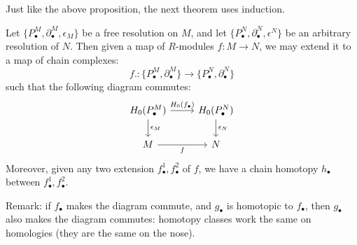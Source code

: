 Just like the above proposition, the next theorem uses induction. 
\begin{thm}
    Let $\{P_\bullet^M, \partial_\bullet^M, \epsilon_M\}$ be a free resolution on $M$, and let $\{P_\bullet^N, \partial_\bullet^N, \epsilon^N\}$ be an arbitrary resolution of $N$. Then given a map of $R$-modules $f: M\to N$, we may extend it to a map of chain complexes:
    \begin{equation*}
        f.: \{P_\bullet^M, \partial_\bullet^M\}\to \{P_\bullet^N, \partial_\bullet^N\}
    \end{equation*}
    such that the following diagram commutes:
    \[\begin{tikzcd}
        {H_0(P_\bullet^M)} & {H_0(P_\bullet^N)} \\
        M & N
        \arrow["{H_0(f_\bullet)}", from=1-1, to=1-2]
        \arrow["{\epsilon_M}", from=1-1, to=2-1]
        \arrow["{\epsilon_N}", from=1-2, to=2-2]
        \arrow["f"', from=2-1, to=2-2]
    \end{tikzcd}\]
    Moreover, given any two extension $f_\bullet^1, f_\bullet^2$ of $f$, we have a chain homotopy $h_\bullet$ between $f_\bullet^1, f_\bullet^2$.
\end{thm}
Remark: if $f_\bullet$ makes the diagram commute, and $g_\bullet$ is homotopic to $f_\bullet$, then $g_\bullet$ also makes the diagram commutes: homotopy classes work the same on homologies (they are the same on the nose).
